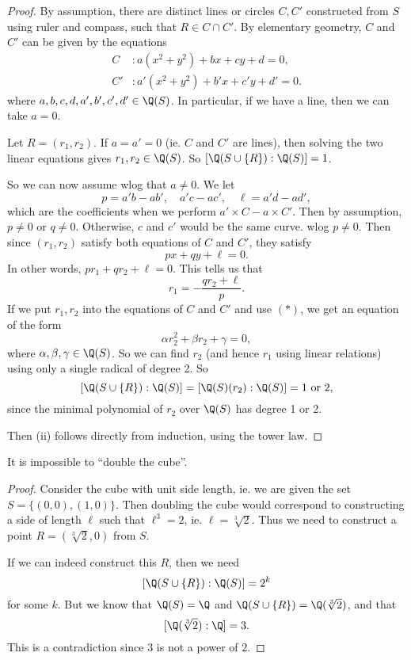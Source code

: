 \documentclass[a4paper]{article}
\begin{document}
\begin{proof}
  By assumption, there are distinct lines or circles $C, C'$ constructed from $S$ using ruler and compass, such that $R\in C\cap C'$. By elementary geometry, $C$ and $C'$ can be given by the equations
  \begin{align*}
    C&: a(x^2 + y^2) + bx + cy + d = 0,\\
    C'&: a'(x^2 + y^2) + b'x + c'y + d' = 0.
  \end{align*}
  where $a, b, c, d, a', b', c', d' \in \Q(S)$. In particular, if we have a line, then we can take $a = 0$.

  Let $R = (r_1, r_2)$. If $a = a' = 0$ (ie. $C$ and $C'$ are lines), then solving the two linear equations gives $r_1, r_2 \in \Q(S)$. So $[\Q(S\cup \{R\}):\Q(S)] = 1$.

  So we can now assume wlog that $a\not = 0$. We let
  \[
    p = a'b - ab',\quad a'c - ac',\quad \ell = a'd - ad',
  \]
  which are the coefficients when we perform $a'\times C - a \times C'$. Then by assumption, $p \not= 0$ or $q \not= 0$. Otherwise, $c$ and $c'$ would be the same curve. wlog $p \not= 0$. Then since $(r_1, r_2)$ satisfy both equations of $C$ and $C'$, they satisfy
  \[
    px + qy + \ell = 0.
  \]
  In other words, $pr_1 + qr_2 + \ell = 0$. This tells us that
  \[
    r_1 = -\frac{qr_2 + \ell}{p}.\tag{$*$}
  \]
  If we put $r_1, r_2$ into the equations of $C$ and $C'$ and use $(*)$, we get an equation of the form
  \[
    \alpha r_2^2 + \beta r_2  + \gamma = 0,
  \]
  where $\alpha, \beta, \gamma \in \Q(S)$. So we can find $r_2$ (and hence $r_1$ using linear relations) using only a single radical of degree 2. So
  \[
    [\Q(S\cup \{R\}):\Q(S)] = [\Q(S)(r_2): \Q(S)] = 1\text{ or }2,
  \]
  since the minimal polynomial of $r_2$ over $\Q(S)$ has degree 1 or 2.

  Then (ii) follows directly from induction, using the tower law.
\end{proof}

\begin{cor}
  It is impossible to ``double the cube''.
\end{cor}

\begin{proof}
  Consider the cube with unit side length, ie. we are given the set $S = \{(0, 0), (1, 0)\}$. Then doubling the cube would correspond to constructing a side of length $\ell$ such that $\ell^3 = 2$, ie. $\ell = \sqrt[3]{2}$. Thus we need to construct a point $R = (\sqrt[3]{2}, 0)$ from $S$.

  If we can indeed construct this $R$, then we need
  \[
    [\Q(S\cup \{R\}):\Q(S)] = 2^k
  \]
  for some $k$.  But we know that $\Q(S) = \Q$ and $\Q(S\cup \{R\}) = \Q(\sqrt[3]{2})$, and that
  \[
    [\Q(\sqrt[3]{2}):\Q] = 3.
  \]
  This is a contradiction since $3$ is not a power of $2$.
\end{proof}
\end{document}

